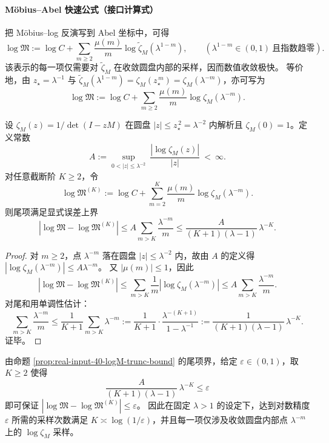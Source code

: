 \paragraph{Möbius--Abel 快速公式（接口计算式）}
把 Möbius--log 反演写到 Abel 坐标中，可得
\[
\log\mathfrak{M}
:=\log C+\sum_{m\ge 2}\frac{\mu(m)}{m}\log\widetilde{\zeta}_M(\lambda^{1-m}),
\qquad (\lambda^{1-m}\in(0,1)\ \text{且指数趋零}).
\]
该表示的每一项仅需要对 $\widetilde{\zeta}_M$ 在收敛圆盘内部的采样，因而数值收敛极快。
等价地，由 $z_\star=\lambda^{-1}$ 与 $\widetilde{\zeta}_M(\lambda^{1-m})=\zeta_M(z_\star^{\,m})=\zeta_M(\lambda^{-m})$，亦可写为
\[
\log\mathfrak{M}
:=\log C+\sum_{m\ge 2}\frac{\mu(m)}{m}\log\zeta_M(\lambda^{-m}).
\]

\begin{proposition}\label{prop:real-input-40-logM-trunc-bound}
设 $\zeta_M(z)=1/\det(I-zM)$ 在圆盘 $|z|\le z_\star^{\,2}=\lambda^{-2}$ 内解析且 $\zeta_M(0)=1$。定义常数
\[
A:=\sup_{0<|z|\le \lambda^{-2}}\ \frac{|\log\zeta_M(z)|}{|z|}\ <\ \infty.
\]
对任意截断阶 $K\ge 2$，令
\[
\log\mathfrak{M}^{(K)}:=\log C+\sum_{m=2}^{K}\frac{\mu(m)}{m}\log\zeta_M(\lambda^{-m}).
\]
则尾项满足显式误差上界
\[
\boxed{\;
|\log\mathfrak{M}-\log\mathfrak{M}^{(K)}|
\le
A\sum_{m>K}\frac{\lambda^{-m}}{m}
\le
\frac{A}{(K+1)(\lambda-1)}\,\lambda^{-K}.
\;}
\]
\end{proposition}
\begin{proof}
对 $m\ge 2$，点 $\lambda^{-m}$ 落在圆盘 $|z|\le\lambda^{-2}$ 内，故由 $A$ 的定义得
\(
|\log\zeta_M(\lambda^{-m})|\le A\lambda^{-m}
\)。
又 $|\mu(m)|\le 1$，因此
\[
|\log\mathfrak{M}-\log\mathfrak{M}^{(K)}|
\le \sum_{m>K}\frac{1}{m}|\log\zeta_M(\lambda^{-m})|
\le A\sum_{m>K}\frac{\lambda^{-m}}{m}.
\]
对尾和用单调性估计：
\[
\sum_{m>K}\frac{\lambda^{-m}}{m}
\le
\frac{1}{K+1}\sum_{m>K}\lambda^{-m}
:=\frac{1}{K+1}\cdot\frac{\lambda^{-(K+1)}}{1-\lambda^{-1}}
:=\frac{1}{(K+1)(\lambda-1)}\,\lambda^{-K}.
\]
证毕。
\end{proof}

\begin{remark}\label{rem:real-input-40-logM-logeps-truncation}
由命题 \ref{prop:real-input-40-logM-trunc-bound} 的尾项界，给定 \(\varepsilon\in(0,1)\)，取 \(K\ge 2\) 使得
\[
\frac{A}{(K+1)(\lambda-1)}\,\lambda^{-K}\le \varepsilon
\]
即可保证 \(|\log\mathfrak{M}-\log\mathfrak{M}^{(K)}|\le \varepsilon\)。
因此在固定 \(\lambda>1\) 的设定下，达到对数精度 \(\varepsilon\) 所需的采样次数满足 \(K\asymp \log(1/\varepsilon)\)，并且每一项仅涉及收敛圆盘内部点 \(\lambda^{-m}\) 上的 \(\log\zeta_M\) 采样。
\end{remark}


